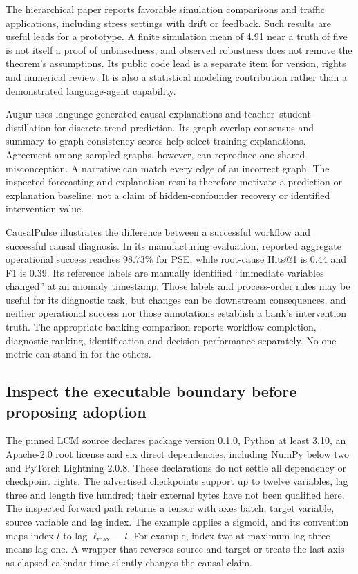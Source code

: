 The hierarchical paper reports favorable simulation comparisons and traffic
applications, including stress settings with drift or feedback. Such results
are useful leads for a prototype. A finite simulation mean of 4.91 near a
truth of five is not itself a proof of unbiasedness, and observed robustness
does not remove the theorem's assumptions. Its public code lead is a
separate item for version, rights and numerical review. It is also a
statistical modeling contribution rather than a demonstrated language-agent
capability.
\citep{exec15_latent_sthcm}

Augur uses language-generated causal explanations and teacher--student
distillation for discrete trend prediction. Its graph-overlap consensus and
summary-to-graph consistency scores help select training explanations.
Agreement among sampled graphs, however, can reproduce one shared
misconception. A narrative can match every edge of an incorrect graph.
The inspected forecasting and explanation results therefore motivate a
prediction or explanation baseline, not a claim of hidden-confounder
recovery or identified intervention value.
\citep{exec13_census_augur_arxiv}

CausalPulse illustrates the difference between a successful workflow and
successful causal diagnosis. In its manufacturing evaluation, reported
aggregate operational success reaches 98.73\% for PSE, while root-cause
Hits@1 is 0.44 and F1 is 0.39. Its reference labels are manually identified
``immediate variables changed'' at an anomaly timestamp. Those labels and
process-order rules may be useful for its diagnostic task, but changes can
be downstream consequences, and neither operational success nor those
annotations establish a bank's intervention truth. The appropriate banking
comparison reports workflow completion, diagnostic ranking, identification
and decision performance separately. No one metric can stand in for the
others.
\citep{exec13_pulse}

\subsection{Inspect the executable boundary before proposing adoption}

The pinned LCM source declares package version 0.1.0, Python at least 3.10,
an Apache-2.0 root license and six direct dependencies, including NumPy below
two and PyTorch Lightning 2.0.8. These declarations do not settle all
dependency or checkpoint rights. The advertised checkpoints support up to
twelve variables, lag three and length five hundred; their external bytes
have not been qualified here. The inspected forward path returns a tensor
with axes batch, target variable, source variable and lag index. The example
applies a sigmoid, and its convention maps index $l$ to lag
$\ell_{\max}-l$. For example, index two at maximum lag three means lag one.
A wrapper that reverses source and target or treats the last axis as elapsed
calendar time silently changes the causal claim.
\citep{exec15_latent_lcm}

